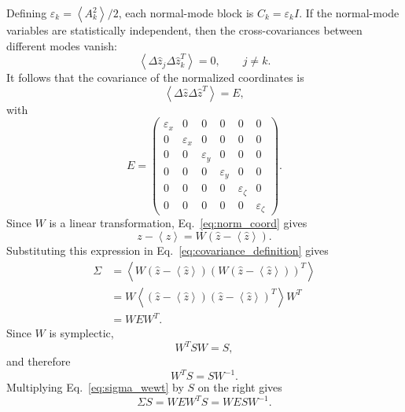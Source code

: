 Defining $\varepsilon_k=\left<A_k^2\right>/2$, each normal-mode block is
$C_k=\varepsilon_k I$. If the normal-mode variables are statistically
independent, then the cross-covariances between different modes vanish:
\begin{equation}
\left<\Delta\hat{z}_j\Delta\hat{z}_k^T\right> = 0,
\qquad j\ne k.
\end{equation}
It follows that the covariance of the normalized coordinates is
\begin{equation}
\left<\Delta\hat{z}\Delta\hat{z}^T\right> = E,
\label{eq:covariance_normalized_coordinates}
\end{equation}
with
\begin{equation}
E =
\left(\begin{array}{cccccc}
\varepsilon_x & 0 & 0 & 0 & 0 & 0\\
0 & \varepsilon_x & 0 & 0 & 0 & 0\\
0 & 0 & \varepsilon_y & 0 & 0 & 0\\
0 & 0 & 0 & \varepsilon_y & 0 & 0\\
0 & 0 & 0 & 0 & \varepsilon_\zeta & 0\\
0 & 0 & 0 & 0 & 0 & \varepsilon_\zeta
\end{array}\right).
\label{eq:covariance_emittance_matrix}
\end{equation}
Since $W$ is a linear transformation, Eq.~\ref{eq:norm_coord} gives
\begin{equation}
z-\left<z\right> = W\left(\hat{z}-\left<\hat{z}\right>\right).
\end{equation}
Substituting this expression in Eq.~\ref{eq:covariance_definition} gives
\begin{align}
\Sigma
&= \left< W\left(\hat{z}-\left<\hat{z}\right>\right)
\left(W\left(\hat{z}-\left<\hat{z}\right>\right)\right)^T \right>\nonumber\\
&= W\left<\left(\hat{z}-\left<\hat{z}\right>\right)
\left(\hat{z}-\left<\hat{z}\right>\right)^T\right>W^T\nonumber\\
&= W E W^T.
\label{eq:sigma_wewt}
\end{align}
Since $W$ is symplectic,
\begin{equation}
W^T S W = S,
\end{equation}
and therefore
\begin{equation}
W^T S = S W^{-1}.
\end{equation}
Multiplying Eq.~\ref{eq:sigma_wewt} by $S$ on the right gives
\begin{equation}
\Sigma S = W E W^T S = W E S W^{-1}.
\label{eq:sigma_s_similarity}
\end{equation}
